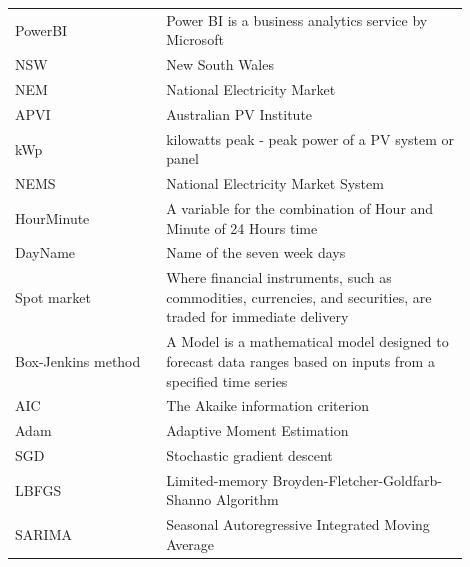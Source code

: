 \documentclass[mstat,12pt]{unswthesis}
\begin{document}
\begin{table}[H]
\begin{tabular}{p{0.3\linewidth} | p{0.6\linewidth}}
PowerBI            & Power BI is a business analytics service by Microsoft                                                            \\
NSW                & New South Wales                                                                                                  \\
NEM                & National Electricity Market                                                                                      \\
APVI               & Australian PV Institute                                                                                          \\
kWp                & kilowatts peak - peak power of a PV system or panel                                                              \\
NEMS               & National Electricity Market System                                                                               \\
HourMinute         & A variable for the combination of Hour and Minute of 24 Hours time                                               \\
DayName            & Name of the seven week days                                                                                      \\
Spot market        & Where financial instruments, such as commodities, currencies, and securities, are traded for immediate delivery  \\
Box-Jenkins method & A  Model is a mathematical model designed to forecast data ranges based on inputs from a specified time series   \\
AIC                & The Akaike information criterion                                                                                 \\
Adam               & Adaptive Moment Estimation                                                                                       \\
SGD                & Stochastic gradient descent                                                                                      \\
LBFGS              & Limited-memory Broyden-Fletcher-Goldfarb-Shanno Algorithm                                                        \\
SARIMA             & Seasonal Autoregressive Integrated Moving Average                                                                \\

\end{tabular}
\end{table}
\end{document}
